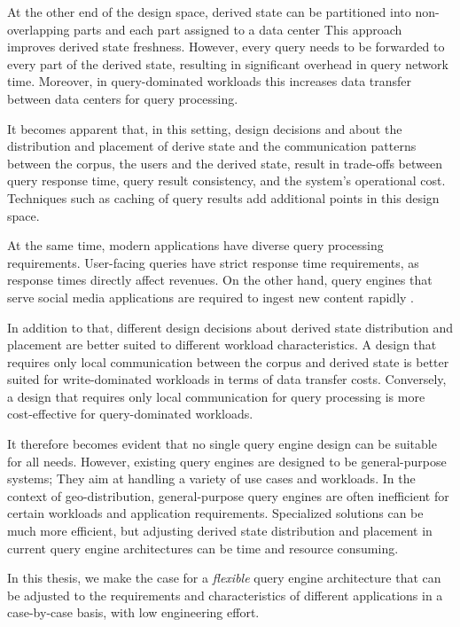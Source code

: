 At the other end of the design space,
derived state can be partitioned into non-overlapping parts and each part assigned to a data center
This approach improves derived state freshness.
However, every query needs to be forwarded to every part of the derived state, resulting in significant overhead in query network time.
Moreover, in query-dominated workloads this increases data transfer between data centers for query processing.

It becomes apparent that, in this setting, design decisions and about the distribution and placement of derive state
and the communication patterns between the corpus, the users and the derived state,
result in trade-offs between query response time, query result consistency, and the system's operational cost.
Techniques such as caching of query results add additional points in this design space.

At the same time,
modern applications have diverse query processing requirements.
User-facing queries have strict response time requirements, as response times directly affect revenues.
On the other hand, query engines that serve social media applications are required to ingest new content rapidly \cite{busch:earlybird}.

In addition to that, different design decisions about derived state distribution and placement are better suited to different workload characteristics.
A design that requires only local communication between the corpus and derived state is better suited for write-dominated workloads in terms of data transfer costs.
Conversely, a design that requires only local communication for query processing is more cost-effective for query-dominated workloads.

It therefore becomes evident that no single query engine design can be suitable for all needs.
However, existing query engines are designed to be general-purpose systems;
They aim at handling a variety of use cases and workloads.
In the context of geo-distribution, general-purpose query engines are often inefficient for certain workloads
and application requirements.
Specialized solutions can be much more efficient,
but adjusting derived state distribution and placement in current query engine architectures can be time and resource consuming.

In this thesis, we make the case for a \textit{flexible} query engine architecture that can be adjusted to the requirements
and characteristics of different applications in a case-by-case basis, with low engineering effort.

